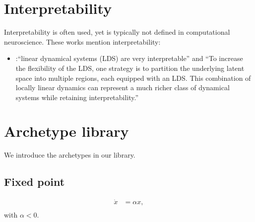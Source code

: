 \documentclass{article}
\theoremstyle{definition} \newtheorem{definition}{Definition}  \newtheorem{example}{Example}
\theoremstyle{remark} \newtheorem{remark}{Remark}
\newcounter{ct}
\begin{document}
\newpage
\section{Interpretability}
Interpretability is often used, yet is typically not defined in computational neuroscience\citep{Zhao2016d, duncker2019learning}.
%
These works mention interpretability:
\begin{itemize}
\item \citet{Nassar2018b}:``linear dynamical systems (LDS) are very interpretable'' and  ``To increase the flexibility of the LDS, one strategy is to partition the underlying latent space into multiple regions, each equipped with an LDS. This combination of locally linear dynamics can represent a much richer class of dynamical systems while retaining interpretability.'' 
\end{itemize}


%






\newpage
\section{Archetype library}\label{sec:library}
We introduce the archetypes in our library.

\subsection{Fixed point}\label{sec:fp}
\[
\begin{aligned}
\dot{x} &= \alpha x, \\
\end{aligned}
\]
with $\alpha<0$. 
\end{document}
